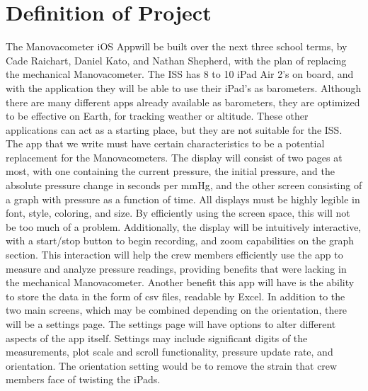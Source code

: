 \documentclass[onecolumn, draftclsnofoot,10pt, compsoc]{IEEEtran}
\def \GroupMemberOne{			Cade Raichart}
\def \GroupMemberTwo{			Daniel Kato}
\def \GroupMemberThree{			Nathan Shepherd}
\def \CapstoneProjectName{		Manovacometer iOS App}
\begin{document}
\section{Definition of Project}
The \CapstoneProjectName will be built over the next three school terms, by \GroupMemberOne, \GroupMemberTwo, and \GroupMemberThree, with the plan of replacing the mechanical Manovacometer.
The ISS has 8 to 10 iPad Air 2's on board, and with the application they will be able to use their iPad's as barometers.
Although there are many different apps already available as barometers, they are optimized to be effective on Earth, for tracking weather or altitude.
These other applications can act as a starting place, but they are not suitable for the ISS.
The app that we write must have certain characteristics to be a potential replacement for the Manovacometers.
The display will consist of two pages at most, with one containing the current pressure, the initial pressure, and the absolute pressure change in seconds per mmHg, and the other screen consisting of a graph with pressure as a function of time.
All displays must be highly legible in font, style, coloring, and size.
By efficiently using the screen space, this will not be too much of a problem.
Additionally, the display will be intuitively interactive, with a start/stop button to begin recording, and zoom capabilities on the graph section.
This interaction will help the crew members efficiently use the app to measure and analyze pressure readings, providing benefits that were lacking in the mechanical Manovacometer.
Another benefit this app will have is the ability to store the data in the form of csv files, readable by Excel.
In addition to the two main screens, which may be combined depending on the orientation, there will be a settings page.
The settings page will have options to alter different aspects of the app itself.
Settings may include significant digits of the measurements, plot scale and scroll functionality, pressure update rate, and orientation.
The orientation setting would be to remove the strain that crew members face of twisting the iPads. 
\end{document}

